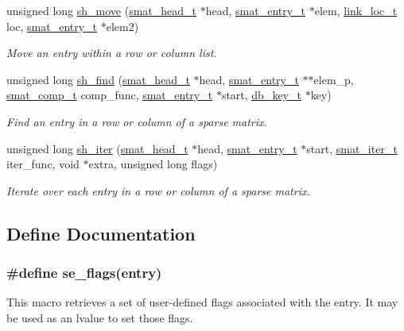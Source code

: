 \begin{CompactItemize}
unsigned long \hyperlink{group__dbprim__smat_a18}{sh\_\-move} (\hyperlink{dbprim_8h_a1}{smat\_\-head\_\-t} $\ast$head, \hyperlink{dbprim_8h_a2}{smat\_\-entry\_\-t} $\ast$elem, \hyperlink{dbprim_8h_a4}{link\_\-loc\_\-t} loc, \hyperlink{dbprim_8h_a2}{smat\_\-entry\_\-t} $\ast$elem2)
\begin{CompactList}\small\item\em Move an entry within a row or column list. \item\end{CompactList}\item 
unsigned long \hyperlink{group__dbprim__smat_a19}{sh\_\-find} (\hyperlink{dbprim_8h_a1}{smat\_\-head\_\-t} $\ast$head, \hyperlink{dbprim_8h_a2}{smat\_\-entry\_\-t} $\ast$$\ast$elem\_\-p, \hyperlink{dbprim_8h_a5}{smat\_\-comp\_\-t} comp\_\-func, \hyperlink{dbprim_8h_a2}{smat\_\-entry\_\-t} $\ast$start, \hyperlink{dbprim_8h_a0}{db\_\-key\_\-t} $\ast$key)
\begin{CompactList}\small\item\em Find an entry in a row or column of a sparse matrix. \item\end{CompactList}\item 
unsigned long \hyperlink{group__dbprim__smat_a20}{sh\_\-iter} (\hyperlink{dbprim_8h_a1}{smat\_\-head\_\-t} $\ast$head, \hyperlink{dbprim_8h_a2}{smat\_\-entry\_\-t} $\ast$start, \hyperlink{dbprim_8h_a4}{smat\_\-iter\_\-t} iter\_\-func, void $\ast$extra, unsigned long flags)
\begin{CompactList}\small\item\em Iterate over each entry in a row or column of a sparse matrix. \item\end{CompactList}\end{CompactItemize}


\subsection{Define Documentation}
\hypertarget{group__dbprim__smat_a41}{
\subsubsection[se\_\-flags]{\setlength{\rightskip}{0pt plus 5cm}\#define se\_\-flags(entry)}}
\label{group__dbprim__smat_a41}


This macro retrieves a set of user-defined flags associated with the entry. It may be used as an lvalue to set those flags.

